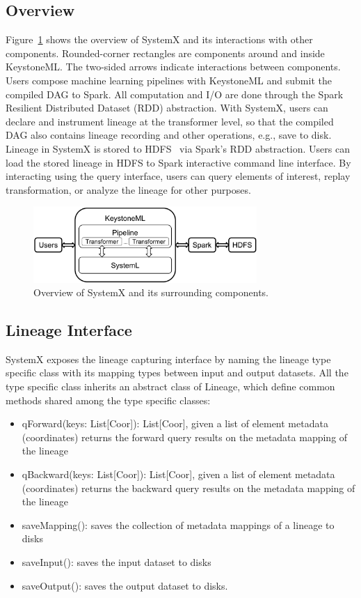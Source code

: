 \documentclass{sig-alternate}
\newenvironment{shortlist}{
        \vspace*{-0.5em}
  \begin{itemize}
  \setlength{\itemsep}{-0.1em}
}{
  \end{itemize}
        \vspace*{-0.5em}
}
\begin{document}
\subsection{Overview}
Figure~\ref{fig:architecture} shows the overview of SystemX and its interactions with other components. 
Rounded-corner rectangles are components around and inside KeystoneML. 
The two-sided arrows indicate interactions between components.
Users compose machine learning pipelines with KeystoneML and submit the compiled DAG to Spark.
All computation and I/O are done through the Spark Resilient Distributed Dataset (RDD) abstraction.
With SystemX, users can declare and instrument lineage at the transformer level, 
so that the compiled DAG also contains lineage recording and other operations, e.g., save to disk.
Lineage in SystemX is stored to HDFS~\cite{shvachko10} via Spark's RDD abstraction.
Users can load the stored lineage in HDFS to Spark interactive command line interface.
By interacting using the query interface, users can query elements of interest, replay transformation, or analyze
the lineage for other purposes.

\begin{figure}[h]
\begin{center}
    \includegraphics[width=85mm]{pictures/architecture}
\caption {Overview of SystemX and its surrounding components.
    \label{fig:architecture}
}
\end{center}
\end{figure}

\subsection{Lineage Interface}
\label{sec:Design-Lineage}
SystemX exposes the lineage capturing interface by naming the lineage type specific class with its mapping types between input and output datasets.
All the type specific class inherits an abstract class of Lineage, which define common methods shared among the type specific classes:
\begin{shortlist}
\item{} qForward(keys: List[Coor]): List[Coor], given a list of element metadata (coordinates) returns the forward query results on the metadata mapping of the lineage
\item{} qBackward(keys: List[Coor]): List[Coor], given a list of element metadata (coordinates) returns the backward query results on the metadata mapping of the lineage
\item{} saveMapping(): saves the collection of metadata mappings of a lineage to disks
\item{} saveInput(): saves the input dataset to disks
\item{} saveOutput(): saves the output dataset to disks.
\end{shortlist}
\end{document}
